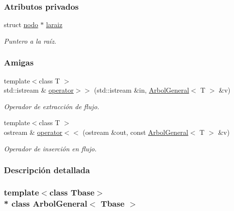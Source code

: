 \subsubsection*{Atributos privados}
\begin{DoxyCompactItemize}
\item 
struct \hyperlink{structArbolGeneral_1_1nodo}{nodo} $\ast$ \hyperlink{classArbolGeneral_a14a859dc79b8df4d5a77b5c871713c9e}{laraiz}
\begin{DoxyCompactList}\small\item\em Puntero a la raíz. \end{DoxyCompactList}\end{DoxyCompactItemize}
\subsubsection*{Amigas}
\begin{DoxyCompactItemize}
\item 
{\footnotesize template$<$class T $>$ }\\std\+::istream \& \hyperlink{classArbolGeneral_ab1318141f030856da7dcfc1c7a162565}{operator$>$$>$} (std\+::istream \&in, \hyperlink{classArbolGeneral}{Arbol\+General}$<$ T $>$ \&v)
\begin{DoxyCompactList}\small\item\em Operador de extracción de flujo. \end{DoxyCompactList}\item 
{\footnotesize template$<$class T $>$ }\\ostream \& \hyperlink{classArbolGeneral_a2b19e120d650b0363eed1bfd8c7f5351}{operator$<$$<$} (ostream \&out, const \hyperlink{classArbolGeneral}{Arbol\+General}$<$ T $>$ \&v)
\begin{DoxyCompactList}\small\item\em Operador de inserción en flujo. \end{DoxyCompactList}\end{DoxyCompactItemize}


\subsubsection{Descripción detallada}
\subsubsection*{template$<$class Tbase$>$\\*
class Arbol\+General$<$ Tbase $>$}

